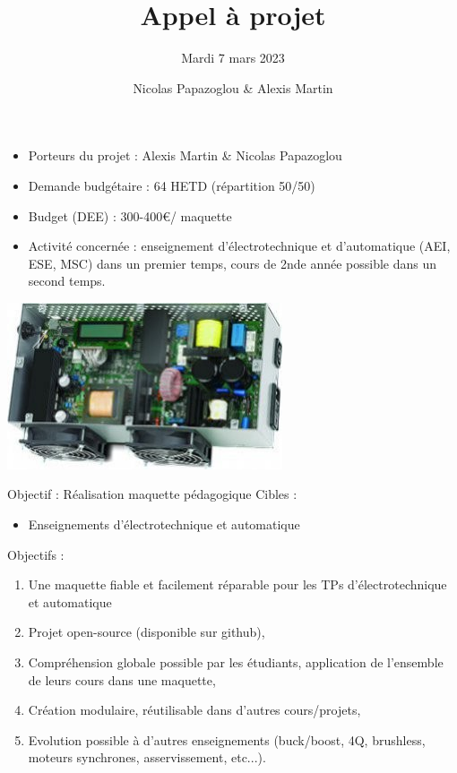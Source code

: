 \documentclass[aspectratio=169]{beamer}
\title{Appel à projet}
\subtitle{Mardi 7 mars 2023}
\date{}
\author[PAPAZOGLOU - MARTIN]{Nicolas Papazoglou \& Alexis Martin}
\institute[ENSEA]{ENSEA}
\begin{document}
\begin{frame}
	\titlepage
\end{frame}

\begin{frame}
\begin{minipage}{0.49\textwidth}
	\begin{itemize}
		\item Porteurs du projet : Alexis Martin \& Nicolas Papazoglou
		\item Demande budgétaire : 64 HETD (répartition 50/50)
		\item Budget (DEE) : 300-400\euro / maquette
		\item Activité concernée : enseignement d'électrotechnique et d'automatique (AEI, ESE, MSC) dans un premier temps, cours de 2nde année possible dans un second temps.
	\end{itemize}
\end{minipage}
\begin{minipage}{0.49\textwidth}
	\includegraphics[scale=0.6]{inverter.jpeg} 
\end{minipage}

\end{frame}
\begin{frame}{Objectif : Réalisation maquette pédagogique}
	Cibles : 
	\begin{itemize}
		\item Enseignements d'électrotechnique et automatique
	\end{itemize}
	Objectifs : 
	\begin{enumerate}
		\item Une maquette fiable et facilement réparable pour les TPs d'électrotechnique et automatique
		\item Projet open-source (disponible sur github),
		\item Compréhension globale possible par les étudiants, application de l'ensemble de leurs cours dans une maquette,
		\item Création modulaire, réutilisable dans d'autres cours/projets, 
		\item Evolution possible à d'autres enseignements (buck/boost, 4Q, brushless, moteurs synchrones, asservissement, etc...).
	\end{enumerate}
\end{frame}
\end{document}
